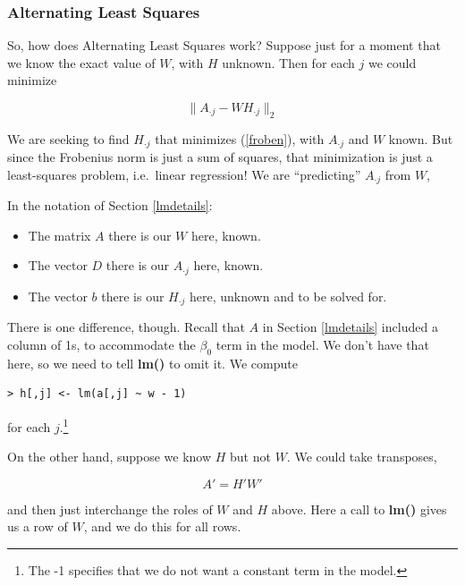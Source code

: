 \subsubsection{Alternating Least Squares}

So, how does Alternating Least Squares work?  Suppose just for a moment
that we know the exact value of $W$, with $H$ unknown.  Then for each
$j$ we could minimize

\begin{equation}
\label{errajwhj}
\|A_{\cdot j} - W H_{\cdot j}\|_2
\end{equation}

We are seeking to find $H_{\cdot j}$ that minimizes (\ref{froben}), with
$A_{\cdot j}$ and $W$ known.  But since the Frobenius norm is just a sum
of squares, that minimization is just a least-squares problem, i.e.\
linear regression!  We are ``predicting'' $A_{\cdot j}$ from $W$,

In the notation of Section \ref{lmdetails}:

\begin{itemize}

\item The matrix $A$ there is our $W$ here, known.

\item The vector $D$ there is our $A_{\cdot j}$ here, known.

\item The vector $b$ there is our $H_{\cdot j}$ here, unknown and to be
solved for.

\end{itemize} 

There is one difference, though.  Recall that $A$ in Section
\ref{lmdetails} included a column of 1s, to accommodate the $\beta_0$
term in the model.  We don't have that here, so we need to tell
\textbf{lm()} to omit it.  We compute 

\begin{lstlisting}
> h[,j] <- lm(a[,j] ~ w - 1)
\end{lstlisting}

for each $j$.\footnote{The -1 specifies that we do not want a constant term in
the model.}

On the other hand, suppose we know $H$ but not $W$.  We could take 
transposes,

\begin{equation}
A' = H' W'
\end{equation}

and then just interchange the roles of $W$ and $H$ above.  Here a call
to {\bf lm()} gives us a row of $W$, and we do this for all rows.

